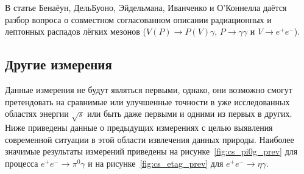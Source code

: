 В статье Бенаёун, ДельБуоно, Эйдельмана, Иванченко и О'Коннелла \cite{Benayoun:1999fv} даётся разбор
вопроса о совместном согласованном описании радиационных и лептонных
распадов лёгких мезонов ($V(P) \to P(V)\gamma$, $P \to \gamma \gamma$ и
$V \to e^+ e^-$).


\subsection{Другие измерения}\label{other-measurments}

Данные измерения не будут являться первыми, однако,
они возможно смогут претендовать на сравнимые или улучшенные точности в уже исследованных областях энергии $\sqrt{s}$
или быть даже первыми и одними из первых в других.
Ниже приведены данные о предыдущих измерениях с целью выявления современной ситуации в этой области извлечения данных природы.
Наиболее значимые результаты измерений приведены на рисунке~\ref{fig:cs_pi0g_prev} для процесса $e^+ e^- \to \pi^0 \gamma$
и на рисунке~\ref{fig:cs_etag_prev} для $e^+ e^- \to \eta \gamma$.

